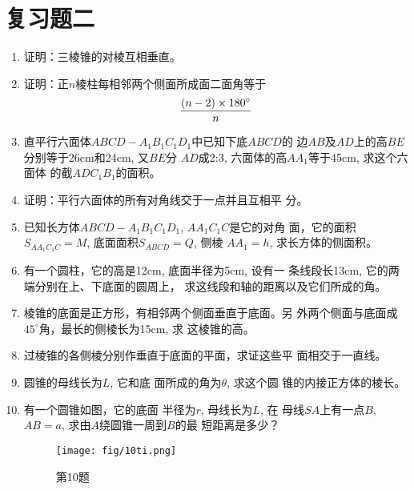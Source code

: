 \section*{复习题二}
\begin{enumerate}
    \item 证明：三棱锥的对棱互相垂直。
    \item 证明：正$n$棱柱每相邻两个侧面所成面二面角等于
\[\dfrac{(n-2)\times 180^{\circ}}{n}\]

\item 直平行六面体$ABCD-A_1B_1C_1D_1$中已知下底$ABCD$的
边$AB$及$AD$上的高$BE$分别等于26cm和24cm, 又$BE$分
$AD$成2:3, 六面体的高$AA_1$等于45cm, 求这个六面体
的截$ADC_1B_1$的面积。
\item 证明：平行六面体的所有对角线交于一点并且互相平
分。
\item 已知长方体$ABCD-A_1B_1C_1D_1$, $AA_1C_1C$是它的对角
面，它的面积$S_{AA_1C_1C}=M$, 底面面积$S_{ABCD}=Q$, 侧棱
$AA_1=h$, 求长方体的侧面积。
\item 有一个圆柱，它的高是12cm, 底面半径为5cm, 设有一
条线段长13cm, 它的两端分别在上、下底面的圆周上，
求这线段和轴的距离以及它们所成的角。
\item 
棱锥的底面是正方形，有相邻两个侧面垂直于底面。另
外两个侧面与底面成$45^{\circ}$角，最长的侧棱长为15cm, 求
这棱锥的高。
\item 过棱锥的各侧棱分别作垂直于底面的平面，求证这些平
面相交于一直线。
\item 圆锥的母线长为$L$, 它和底
面所成的角为$\theta$, 求这个圆
锥的内接正方体的棱长。
\item 有一个圆锥如图，它的底面
半径为$r$, 母线长为$L$, 在
母线$SA$上有一点$B$, $AB=a$,
求由$A$绕圆锥一周到$B$的最
短距离是多少？

\begin{figure}[htp]
    \centering
    \texttt{[image: fig/10ti.png]}
    \caption*{第10题}
\end{figure}


\end{enumerate}
